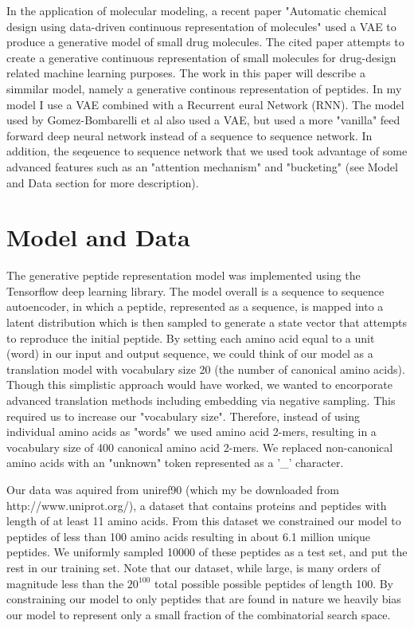 \documentclass[preprint,12pt]{elsarticle}
\begin{document}
In the application of molecular modeling, a recent paper "Automatic chemical design using data-driven continuous representation of molecules"\cite{gomez2016automatic} used a VAE to produce a generative model of small drug molecules. The cited paper attempts to create a generative continuous representation of small molecules for drug-design related machine learning purposes. The work in this paper will describe a simmilar model, namely a generative continous representation of peptides. In my model I use a VAE combined with a Recurrent eural Network (RNN). The model used by Gomez-Bombarelli et al also used a VAE, but used a more "vanilla" feed forward deep neural network instead of a sequence to sequence network. In addition, the seqeuence to sequence network that we used took advantage of some advanced features such as an "attention mechanism" and "bucketing" (see Model and Data section for more description).

\section{Model and Data}

The generative peptide representation model was implemented using the Tensorflow deep learning library\cite{tensorflow2015-whitepaper}. The model overall is a sequence to sequence autoencoder, in which a peptide, represented as a sequence, is mapped into a latent distribution which is then sampled to generate a state vector that attempts to reproduce the initial peptide. By setting each amino acid equal to a unit (word) in our input and output sequence, we could think of our model as a translation model with vocabulary size 20 (the number of canonical amino acids). Though this simplistic approach would have worked, we wanted to encorporate advanced translation methods including embedding via negative sampling. This required us to increase our "vocabulary size". Therefore, instead of using individual amino acids as "words" we used amino acid 2-mers, resulting in a vocabulary size of 400 canonical amino acid 2-mers. We replaced non-canonical amino acids with an "unknown" token represented as a '\_' character.

Our data was aquired from uniref90 (which my be downloaded from http://www.uniprot.org/), a dataset that contains proteins and peptides with length of at least 11 amino acids. From this dataset we constrained our model to peptides of less than 100 amino acids resulting in about 6.1 million unique peptides. We uniformly sampled 10000 of these peptides as a test set, and put the rest in our training set. Note that our dataset, while large, is many orders of magnitude less than the $20^{100}$ total possible possible peptides of length 100. By constraining our model to only peptides that are found in nature we heavily bias our model to represent only a small fraction of the combinatorial search space.
\end{document}
